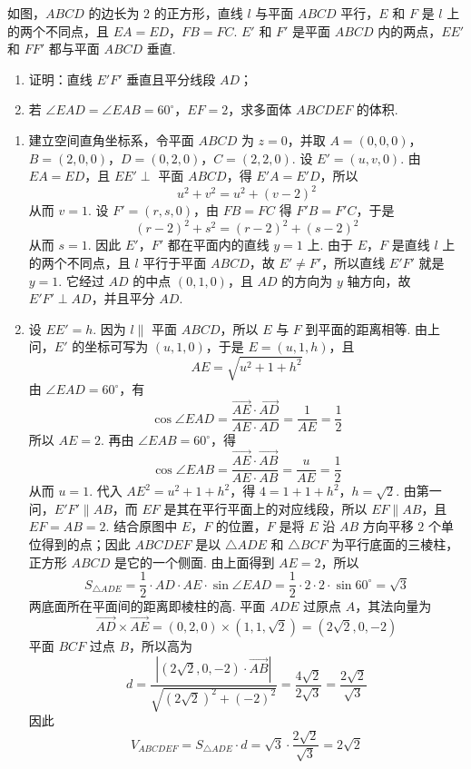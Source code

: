\begin{problem}
如图，\(ABCD\) 的边长为 \(2\) 的正方形，直线 \(l\) 与平面 \(ABCD\) 平行，\(E\) 和 \(F\) 是 \(l\) 上的两个不同点，且 \(EA = ED\)，\(FB = FC\). \(E'\) 和 \(F'\) 是平面 \(ABCD\) 内的两点，\(EE'\) 和 \(FF'\) 都与平面 \(ABCD\) 垂直.

\begin{enumerate}
\item 证明：直线 \(E'F'\) 垂直且平分线段 \(AD\)；
\item 若 \(\angle EAD = \angle EAB = 60^{\circ}\)，\(EF = 2\)，求多面体 \(ABCDEF\) 的体积.
\end{enumerate}

\end{problem}

\begin{solution}
\begin{enumerate}
\item 建立空间直角坐标系，令平面 \(ABCD\) 为 \(z=0\)，并取
\(A=(0,0,0)\)，\(B=(2,0,0)\)，\(D=(0,2,0)\)，\(C=(2,2,0)\).
设 \(E'=(u,v,0)\). 由 \(EA=ED\)，且 \(EE'\perp\) 平面 \(ABCD\)，得 \(E'A=E'D\)，所以
\[
u^2+v^2=u^2+(v-2)^2
\]
从而 \(v=1\). 设 \(F'=(r,s,0)\)，由 \(FB=FC\) 得 \(F'B=F'C\)，于是
\[
(r-2)^2+s^2=(r-2)^2+(s-2)^2
\]
从而 \(s=1\). 因此 \(E'\)，\(F'\) 都在平面内的直线 \(y=1\) 上. 由于 \(E\)，\(F\) 是直线 \(l\) 上的两个不同点，且 \(l\) 平行于平面 \(ABCD\)，故 \(E'\ne F'\)，所以直线 \(E'F'\) 就是 \(y=1\). 它经过 \(AD\) 的中点 \((0,1,0)\)，且 \(AD\) 的方向为 \(y\) 轴方向，故 \(E'F'\perp AD\)，并且平分 \(AD\).
\item 设 \(EE'=h\). 因为 \(l\parallel\) 平面 \(ABCD\)，所以 \(E\) 与 \(F\) 到平面的距离相等. 由上问，\(E'\) 的坐标可写为 \((u,1,0)\)，于是 \(E=(u,1,h)\)，且
\[
AE=\sqrt{u^2+1+h^2}
\]
由 \(\angle EAD=60^\circ\)，有
\[
\cos\angle EAD
=\frac{\overrightarrow{AE}\cdot\overrightarrow{AD}}{AE\cdot AD}
=\frac{1}{AE}=\frac{1}{2}
\]
所以 \(AE=2\). 再由 \(\angle EAB=60^\circ\)，得
\[
\cos\angle EAB
=\frac{\overrightarrow{AE}\cdot\overrightarrow{AB}}{AE\cdot AB}
=\frac{u}{AE}=\frac{1}{2}
\]
从而 \(u=1\). 代入 \(AE^2=u^2+1+h^2\)，得
\(4=1+1+h^2\)，\(h=\sqrt{2}\).
由第一问，\(E'F'\parallel AB\)，而 \(EF\) 是其在平行平面上的对应线段，所以 \(EF\parallel AB\)，且 \(EF=AB=2\). 结合原图中 \(E\)，\(F\) 的位置，\(F\) 是将 \(E\) 沿 \(AB\) 方向平移 \(2\) 个单位得到的点；因此 \(ABCDEF\) 是以 \(\triangle ADE\) 和 \(\triangle BCF\) 为平行底面的三棱柱，正方形 \(ABCD\) 是它的一个侧面. 由上面得到 \(AE=2\)，所以
\[
S_{\triangle ADE}=\frac{1}{2}\cdot AD\cdot AE\cdot\sin\angle EAD
=\frac{1}{2}\cdot2\cdot2\cdot\sin60^{\circ}=\sqrt{3}
\]
两底面所在平面间的距离即棱柱的高. 平面 \(ADE\) 过原点 \(A\)，其法向量为
\[
\overrightarrow{AD}\times\overrightarrow{AE}=(0,2,0)\times(1,1,\sqrt{2})=(2\sqrt{2},0,-2)
\]
平面 \(BCF\) 过点 \(B\)，所以高为
\[
d=\frac{\left|(2\sqrt{2},0,-2)\cdot\overrightarrow{AB}\right|}{\sqrt{(2\sqrt{2})^2+(-2)^2}}
=\frac{4\sqrt{2}}{2\sqrt{3}}=\frac{2\sqrt{2}}{\sqrt{3}}
\]
因此
\[
V_{ABCDEF}=S_{\triangle ADE}\cdot d=\sqrt{3}\cdot\frac{2\sqrt{2}}{\sqrt{3}}=2\sqrt{2}
\]
\end{enumerate}
\end{solution}

